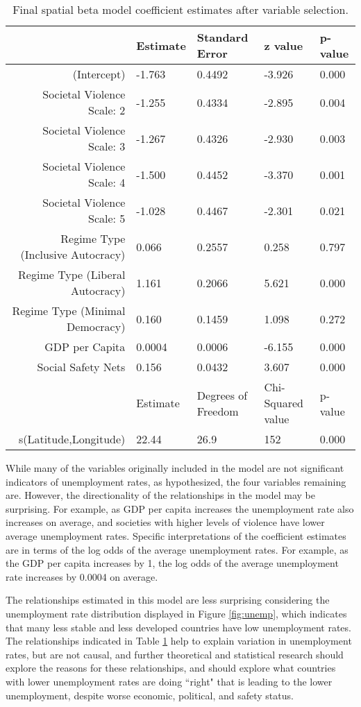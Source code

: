 \documentclass[letterpaper,11pt]{article}
\begin{document}
\begin{table}[ht]
\footnotesize
\centering
\begin{tabular}{rllll}
  \hline
  & Estimate & Standard Error & z value & p-value \\ 
  \hline
(Intercept) & -1.763 & 0.4492 & -3.926 & 0.000 \\ 
Societal Violence Scale: 2 & -1.255 & 0.4334 & -2.895 & 0.004 \\
Societal Violence Scale: 3 & -1.267 & 0.4326 & -2.930 & 0.003 \\
Societal Violence Scale: 4 & -1.500 & 0.4452 & -3.370 & 0.001 \\
Societal Violence Scale: 5 & -1.028 & 0.4467 & -2.301 & 0.021 \\
Regime Type (Inclusive Autocracy) & 0.066 & 0.2557 & 0.258 & 0.797 \\ 
Regime Type (Liberal Autocracy) & 1.161 & 0.2066 & 5.621 & 0.000 \\ 
Regime Type (Minimal Democracy) & 0.160 & 0.1459 & 1.098 & 0.272 \\ 
GDP per Capita & 0.0004 & 0.0006 & -6.155 & 0.000 \\ 
Social Safety Nets & 0.156 & 0.0432 & 3.607 & 0.000 \\
\hline
\hline
 & Estimate & Degrees of Freedom & Chi-Squared value & p-value \\
 \hline
s(Latitude,Longitude) & 22.44 & 26.9 & 152 & 0.000 \\
   \hline
\end{tabular}
\caption{Final spatial beta model coefficient estimates after variable selection.}
\label{tab:est}
\end{table}

While many of the variables originally included in the model are not significant indicators of unemployment rates, as hypothesized, the four variables remaining are. However, the directionality of the relationships in the model may be surprising. For example, as GDP per capita increases the unemployment rate also increases on average, and societies with higher levels of violence have lower average unemployment rates. Specific interpretations of the coefficient estimates are in terms of the log odds of the average unemployment rates. For example, as the GDP per capita increases by 1, the log odds of the average unemployment rate increases by 0.0004 on average.

The relationships estimated in this model are less surprising considering the unemployment rate distribution displayed in Figure \ref{fig:unemp}, which indicates that many less stable and less developed countries have low unemployment rates. The relationships indicated in Table \ref{tab:est} help to explain variation in unemployment rates, but are not causal, and further theoretical and statistical research should explore the reasons for these relationships, and should explore what countries with lower unemployment rates are doing ``right" that is leading to the lower unemployment, despite worse economic, political, and safety status.
\end{document}
